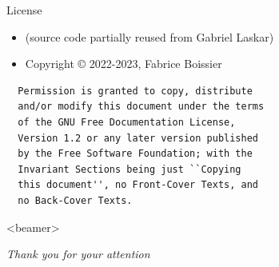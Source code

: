 \documentclass[12pt,a4paper]{beamer}
\begin{document}
\frame[plain]{\titlepage}

\newpage


\begin{frame}{License}

  \begin{itemize}
    \item (\latex source code partially reused from Gabriel Laskar)
    \item Copyright \copyright{} 2022-2023, Fabrice Boissier
  \end{itemize}

  \begin{verbatim}
  Permission is granted to copy, distribute
  and/or modify this document under the terms
  of the GNU Free Documentation License,
  Version 1.2 or any later version published
  by the Free Software Foundation; with the
  Invariant Sections being just ``Copying
  this document'', no Front-Cover Texts, and
  no Back-Cover Texts.
  \end{verbatim}

\end{frame}















\begin{frame}<beamer>{}

  \begin{center}
  \textit{Thank you for your attention}
  \end{center}

\end{frame}
\end{document}
